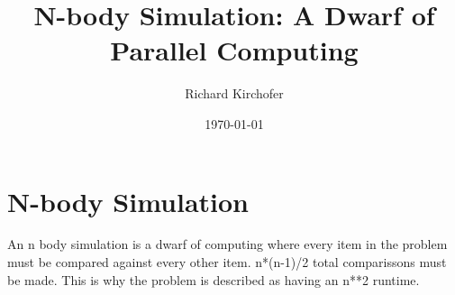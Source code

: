 \documentclass[12pt]{article}
\title{N-body Simulation: A Dwarf of Parallel Computing}
\author{Richard Kirchofer}
\date{\today}
\begin{document}
\maketitle
\section{N-body Simulation}
An n body simulation is a dwarf of computing where every item in the problem must be compared against every other item. n*(n-1)/2 total comparissons must be made. This is why the problem is described as having an n**2 runtime.
\end{document}
